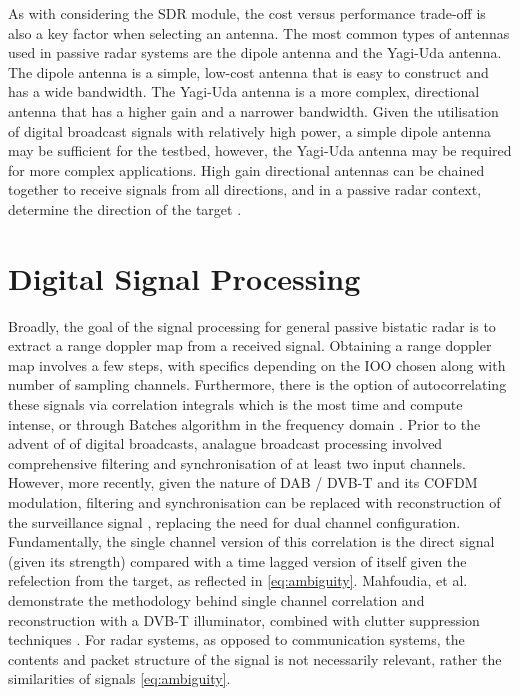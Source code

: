 As with considering the SDR module, the cost versus performance trade-off is also a key factor when selecting an antenna. The most common types of antennas used in passive radar systems are the dipole antenna and the Yagi-Uda antenna. The dipole antenna is a simple, low-cost antenna that is easy to construct and has a wide bandwidth. The Yagi-Uda antenna is a more complex, directional antenna that has a higher gain and a narrower bandwidth. Given the utilisation of digital broadcast signals with relatively high power, a simple dipole antenna may be sufficient for the testbed, however, the Yagi-Uda antenna may be required for more complex applications. High gain directional antennas can be chained together to receive signals from all directions, and in a passive radar context, determine the direction of the target \cite{KrakenSDR}.


\section{Digital Signal Processing}
Broadly, the goal of the signal processing for general passive bistatic radar is to extract a range doppler map from a received signal. Obtaining a range doppler map involves a few steps, with specifics depending on the IOO chosen along with number of sampling channels. Furthermore, there is the option of autocorrelating these signals via correlation integrals which is the most time and compute intense, or through Batches algorithm in the frequency domain \cite{IOTpassiveRadar}. Prior to the advent of of digital broadcasts, analague broadcast processing involved comprehensive filtering and synchronisation of at least two input channels\cite{DSPfm}. However, more recently, given the nature of DAB / DVB-T and its COFDM modulation, filtering and synchronisation can be replaced with reconstruction of the surveillance signal \cite{DSPdab}, replacing the need for dual channel configuration. Fundamentally, the single channel version of this correlation is the direct signal (given its strength) compared with a time lagged version of itself given the refelection from the target, as reflected in \ref{eq:ambiguity}. Mahfoudia, et al. demonstrate the methodology behind single channel correlation and reconstruction with a DVB-T illuminator, combined with clutter suppression techniques \cite{singleChannel}. For radar systems, as opposed to communication systems, the contents and packet structure of the signal is not necessarily relevant, rather the similarities of signals \ref{eq:ambiguity}.


